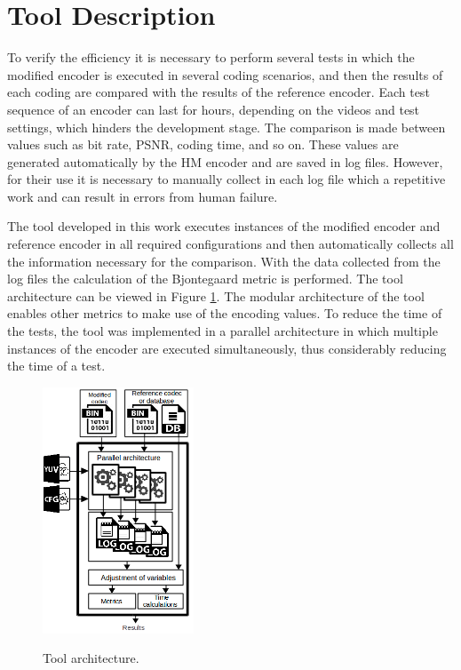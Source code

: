\documentclass[journal]{IEEEtran}
\begin{document}
\section{Tool Description}

To verify the efficiency it is necessary to perform several tests in which the modified encoder is executed in several coding scenarios, and then the results of each coding are compared with the results of the reference encoder. Each test sequence of an encoder can last for hours, depending on the videos and test settings, which hinders the development stage. The comparison is made between values such as bit rate, PSNR, coding time, and so on. These values are generated automatically by the HM encoder and are saved in log files. However, for their use it is necessary to manually collect in each log file which a repetitive work and can result in errors from human failure. 

The tool developed in this work executes instances of the modified encoder and reference encoder in all required configurations and then automatically collects all the information necessary for the comparison. With the data collected from the log files the calculation of the Bjontegaard \cite{Bjontegaard} metric is performed. The tool architecture can be viewed in Figure \ref{fig:fluxo}. The modular architecture of the tool enables other metrics to make use of the encoding values. To reduce the time of the tests, the tool was implemented in a parallel architecture in which multiple instances of the encoder are executed simultaneously, thus considerably reducing the time of a test.
\FloatBarrier
\begin{figure}[!ht]
	\centering
	\caption{Tool architecture.}
	\includegraphics[width=0.4\textwidth]{figures/fluxo.png}
	\label{fig:fluxo}	
\end{figure}
\FloatBarrier
\end{document}
